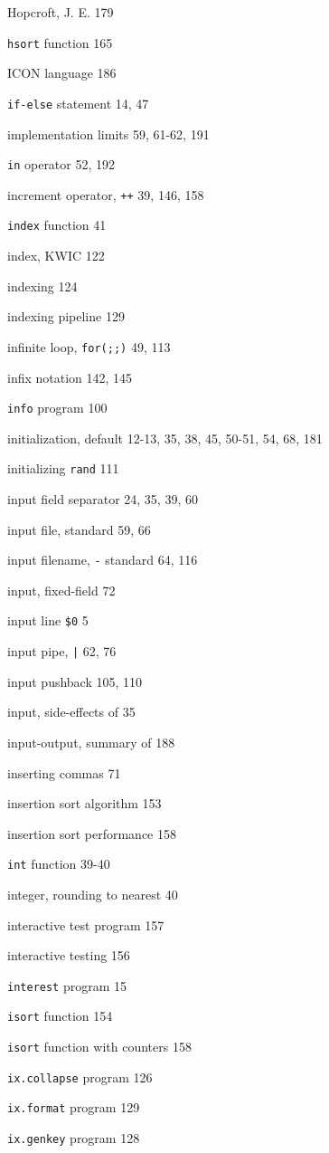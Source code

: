 \begin{multicols}{3}
Hopcroft, J. E. 179

\verb'hsort' function 165

ICON language 186

\verb'if-else' statement 14, 47

implementation limits 59, 61-62, 191

\verb'in' operator 52, 192

increment operator, \verb'++' 39, 146, 158

\verb'index' function 41

index, KWIC 122

indexing 124

indexing pipeline 129

infinite loop, \verb'for(;;)' 49, 113

infix notation 142, 145

\verb'info' program 100

initialization, default 12-13, 35, 38, 45, 50-51, 54, 68, 181

initializing \verb'rand' 111

input field separator 24, 35, 39, 60

input file, standard 59, 66

input filename, \verb'-' standard 64, 116

input, fixed-field 72

input line \verb'$0' 5

input pipe, \verb'|' 62, 76

input pushback 105, 110

input, side-effects of 35

input-output, summary of 188

inserting commas 71

insertion sort algorithm 153

insertion sort performance 158

\verb'int' function 39-40

integer, rounding to nearest 40

interactive test program 157

interactive testing 156

\verb'interest' program 15 

\verb'isort' function 154

\verb'isort' function with counters 158

\verb'ix.collapse' program 126

\verb'ix.format' program 129 

\verb'ix.genkey' program 128 


\end{multicols}

